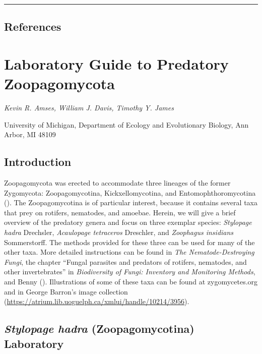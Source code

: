 \documentclass[]{book}
\begin{document}
\begin{center}\rule{0.5\linewidth}{\linethickness}\end{center}

\hypertarget{references}{%
\section{References}\label{references}}

\hypertarget{predatory}{%
\chapter{Laboratory Guide to Predatory Zoopagomycota}\label{predatory}}

\emph{Kevin R. Amses, William J. Davis, Timothy Y. James}

University of Michigan, Department of Ecology and Evolutionary Biology, Ann Arbor, MI 48109

\hypertarget{introduction-1}{%
\section{Introduction}\label{introduction-1}}

Zoopagomycota was erected to accommodate three lineages of the former Zygomycota: Zoopagomycotina, Kickxellomycotina, and Entomophthoromycotina (\citet{Spatafora_2016}). The Zoopagomycotina is of particular interest, because it contains several taxa that prey on rotifers, nematodes, and amoebae. Herein, we will give a brief overview of the predatory genera and focus on three exemplar species: \emph{Stylopage hadra} Drechsler, \emph{Acaulopage tetraceros} Dreschler, and \emph{Zoophagus insidians} Sommerstorff. The methods provided for these three can be used for many of the other taxa. More detailed instructions can be found in \emph{The Nematode-Destroying Fungi}, the chapter ``Fungal parasites and predators of rotifers, nematodes, and other invertebrates'' in \emph{Biodiversity of Fungi: Inventory and Monitoring Methods}, and Benny (\citeyearpar{Benny_2008}). Illustrations of some of these taxa can be found at zygomycetes.org and in George Barron's image collection (\url{https://atrium.lib.uoguelph.ca/xmlui/handle/10214/3956}).

\hypertarget{stylopage-hadra-zoopagomycotina-laboratory}{%
\section{\texorpdfstring{\emph{Stylopage hadra} (Zoopagomycotina) Laboratory}{Stylopage hadra (Zoopagomycotina) Laboratory}}\label{stylopage-hadra-zoopagomycotina-laboratory}}
\end{document}

